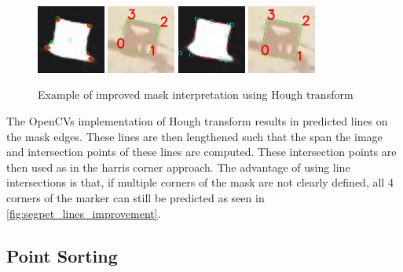 \documentclass[10pt]{book}
\begin{document}
\begin{figure}
  \centering
     {\includegraphics[width=0.2\textwidth]{image/segpet_mask_2_pred_corners}}
     {\includegraphics[width=0.2\textwidth]{image/segpet_mask_2_pred_rect}}
     {\includegraphics[width=0.2\textwidth]{image/segpet_mask_2_pred_intersects}}
     {\includegraphics[width=0.2\textwidth]{image/segpet_mask_2_lines_pred_rect}}
  \caption{Example of improved mask interpretation using Hough transform}
  \label{fig:segpet_lines_improvement}
\end{figure}

The \acp{OpenCV} implementation of Hough transform results in predicted lines on the mask edges. These lines are then lengthened such that the span the image and intersection points of these lines are computed. These intersection points are then used as in the harris corner approach. The advantage of using line intersections is that, if multiple corners of the mask are not clearly defined, all 4 corners of the marker can still be predicted as seen in \autoref{fig:segpet_lines_improvement}.

\subsection{Point Sorting}
\end{document}
